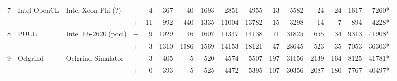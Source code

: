 \begin{tabular}{llll | rrrrrr | rrrrrr }
\hline
\multirow{ 2}{*}{7} & \multirow{ 2}{*}{Intel OpenCL} & \multirow{ 2}{*}{Intel Xeon Phi (?)} & $-$ & 4 & 367 & 40 & 1693 & 2851 & 4955       & 13 & 5582 & 24 & 24 & 1617 & 7260* \\& & & $+$ & 11 & 992 & 440 & 1335 & 11004 & 13782 & 15 & 3298 & 14 & 7 & 894 & 4228* \\
\hline
\multirow{ 2}{*}{8} & \multirow{ 2}{*}{POCL} & \multirow{ 2}{*}{Intel E5-2620 (pocl)} & $-$ & 9 & 1029 & 146 & 1607 & 11347 & 14138       & 71 & 31825 & 665 & 34 & 9313 & 41908* \\& & & $+$ & 3 & 1310 & 1086 & 1569 & 14153 & 18121 & 47 & 28645 & 523 & 35 & 7053 & 36303* \\
\hline
\multirow{ 2}{*}{9} & \multirow{ 2}{*}{Oclgrind} & \multirow{ 2}{*}{Oclgrind Simulator} & $-$ & 3 & 405 & 5 & 520 & 4574 & 5507       & 197 & 31156 & 2139 & 164 & 8125 & 41781* \\& & & $+$ & 0 & 393 & 5 & 525 & 4472 & 5395 & 107 & 30356 & 2087 & 180 & 7767 & 40497* \\
  \bottomrule
\end{tabular}

